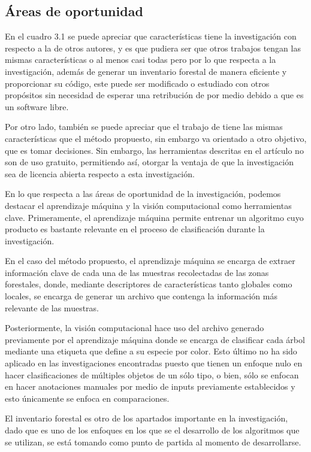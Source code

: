 \subsection{Áreas de oportunidad}
En el cuadro 3.1 se puede apreciar que características tiene la investigación con respecto a la de otros autores, y es que pudiera ser que otros trabajos tengan las mismas características o al menos casi todas pero por lo que respecta a la investigación, además de generar un inventario forestal de manera eficiente y proporcionar su código, este puede ser modificado o estudiado con otros propósitos sin necesidad de esperar una retribución de por medio debido a que es un software libre.

Por otro lado, también se puede apreciar que el trabajo de \citet{rf10} tiene las mismas características que el método propuesto, sin embargo va orientado a otro objetivo, que es tomar decisiones. Sin embargo, las herramientas descritas en el artículo no son de uso gratuito, permitiendo así, otorgar la ventaja de que la investigación sea de licencia abierta respecto a esta investigación.

En lo que respecta a las áreas de oportunidad de la investigación, podemos destacar el aprendizaje máquina y la visión computacional como herramientas clave. Primeramente, el aprendizaje máquina permite entrenar un algoritmo cuyo producto es bastante relevante en el proceso de clasificación durante la investigación.

En el caso del método propuesto, el aprendizaje máquina se encarga de extraer información clave de cada una de las muestras recolectadas de las zonas forestales, donde, mediante descriptores de características tanto globales como locales, se encarga de generar un archivo que contenga la información más relevante de las muestras.

Posteriormente, la visión computacional hace uso del archivo generado previamente por el aprendizaje máquina donde se encarga de clasificar cada árbol mediante una etiqueta que define a su especie por color. Esto último no ha sido aplicado en las investigaciones encontradas puesto que tienen un enfoque nulo en hacer clasificaciones de múltiples objetos de un sólo tipo, o bien, sólo se enfocan en hacer anotaciones manuales por medio de inputs previamente establecidos y esto únicamente se enfoca en comparaciones.

El inventario forestal es otro de los apartados importante en la investigación, dado que es uno de los enfoques en los que se el desarrollo de los algoritmos que se utilizan, se está tomando como punto de partida al momento de desarrollarse. 

